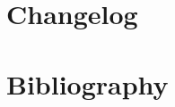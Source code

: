 \documentclass[letterpaper,10pt,openany,oneside]{sphinxmanual}
\begin{document}
\newpage
\chapter{Changelog}



\chapter{Bibliography}
\printbibliography[heading=none]




\renewcommand{\indexname}{Index}
\printindex
\end{document}
